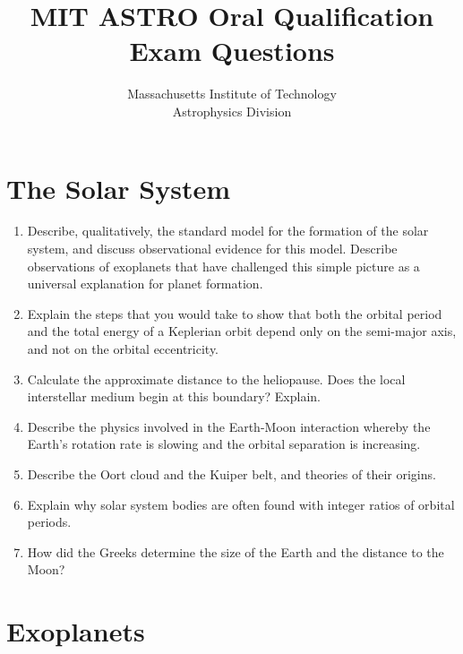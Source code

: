 \documentclass[11pt, oneside]{book}
\title{\textbf{MIT ASTRO Oral Qualification Exam Questions}}
\author{Massachusetts Institute of Technology \\ Astrophysics Division}
\date{}
\begin{document}
\maketitle 


\setcounter{page}{1}

\section{The Solar System}

\begin{enumerate}[start=1, itemsep=0.4cm]
    \item Describe, qualitatively, the standard model for the formation of the solar system, and discuss observational evidence for this model. Describe observations of exoplanets that have challenged this simple picture as a universal explanation for planet formation.
    \item Explain the steps that you would take to show that both the orbital period and the total energy of a Keplerian orbit depend only on the semi-major axis, and not on the orbital eccentricity.
    \item Calculate the approximate distance to the heliopause. Does the local interstellar medium begin at this boundary? Explain.
    \item Describe the physics involved in the Earth-Moon interaction whereby the Earth's rotation rate is slowing and the orbital separation is increasing.
    \item Describe the Oort cloud and the Kuiper belt, and theories of their origins.
    \item Explain why solar system bodies are often found with integer ratios of orbital periods.
    \item How did the Greeks determine the size of the Earth and the distance to the Moon?
\end{enumerate}

\section{Exoplanets}
\end{document}
